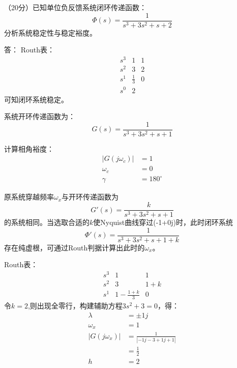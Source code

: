\question（20分）已知单位负反馈系统闭环传递函数：
	$$\Phi(s)=\frac{1}{s^3+3s^2+s+2}$$
分析系统稳定性与稳定裕度。


\onlyanswer
{
	答：
	Routh表：
$$
\begin{matrix}
 s^3  & 1 & 1 \\
 s^2  & 3 & 2 \\
 s^1  & \frac{1}{3}  & 0 \\
 s^0  & 2
\end{matrix}
$$
可知闭环系统稳定。

	系统开环传递函数为：
     $$G(s)=\frac{1}{s^3+3s^2+s+1}$$

计算相角裕度：
\begin{align*}
|G(j\omega_c)|&=1\\
\omega_c &=0\\
\gamma &=180^\circ
\end{align*}

原系统穿越频率$\omega_x$与开环传递函数为
$$G'(s)=\frac{k}{s^3+3s^2+s+1}$$
的系统相同。当选取合适的$k$使Nyquist曲线穿过(-1+0j)时，此时闭环系统
	$$\Phi'(s)=\frac{1}{s^3+3s^2+s+1+k}$$
存在纯虚根，可通过Routh判据计算出此时的$\omega_x$。

	Routh表：
	$$
	\begin{matrix}
	s^3  & 1 & 1 \\
	s^2  & 3 & 1+k \\
	s^1  & 1-\frac{1+k}{3} & 0 
	\end{matrix}
	$$
令$k=2$,则出现全零行，构建辅助方程$3s^2+3=0$，得：
\begin{align*}
\lambda &=\pm 1j \\
\omega_x &=1 \\
|G(j\omega_x )| &=\frac{1}{|-1j-3+1j+1|} \\
 &=\frac{1}{2} \\
h &= 2
\end{align*}


}
